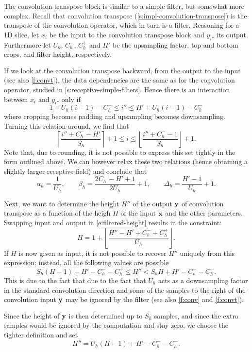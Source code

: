 The convolution transpose block is similar to a simple filter, but somewhat more complex. Recall that convolution transpose (\autoref{s:impl-convolution-transpose}) is the transpose of the convolution operator, which in turn is a filter. Reasoning for a 1D slice, let $x_i$ be the input to the convolution transpose block and $y_{i''}$ its output. Furthermore let $U_h$, $C_h^-$, $C_h^+$ and $H'$ be the upsampling factor, top and bottom crops, and filter height, respectively.

If we look at the convolution transpose backward, from the output to the input (see also \autoref{f:convt}), the data dependencies are the same as for the convolution operator, studied in \autoref{s:receptive-simple-filters}. Hence there is an interaction between $x_i$ and $y_{i''}$ only if
\begin{equation}\label{e:convt-bounds}
   1 + U_h(i - 1) - C_h^- \leq i'' \leq H' + U_h(i - 1) - C_h^-
\end{equation}
where cropping becomes padding and upsampling becomes downsampling. Turning this relation around, we find that
\[
 \left\lceil \frac{i'' + C_h^- -H'}{S_h} \right\rceil + 1
 \leq
 i
 \leq
 \left\lfloor \frac{i'' + C_h^- - 1}{S_h} \right\rfloor + 1 .
\]
Note that, due to rounding, it is not possible to express this set tightly in the form outlined above. We can however relax these two relations (hence obtaining a slightly larger receptive field) and conclude that
\[
\alpha_h = \frac{1}{U_h},
\qquad
\beta_h = \frac{2C_h^- - H' + 1}{2 U_h} + 1,
\qquad
\Delta_h = \frac{H' -1}{U_h} + 1.
\]

Next, we want to determine the height $H''$ of the output $\mathbf{y}$ of convolution transpose as a function of the heigh $H$ of the input $\mathbf{x}$ and the other parameters. Swapping input and output in  \autoref{e:filtered-height} results in the constraint:
\[
H = 1+ \left\lfloor \frac{H'' - H' + C_h^- + C_h^+}{U_h} \right\rfloor.
\]
If $H$ is now given as input, it is not possible to recover $H''$ uniquely from this expression; instead, all the following values are possible
\[
   S_h (H-1) +H' -  C_h^- - C_h^+ \leq H'' < S_h H +H' -  C_h^- - C_h^+.
\]
This is due to the fact that due to the fact that $U_h$ acts as a downsampling factor in the standard convolution direction and some of the samples to the right of the convolution input $\mathbf{y}$ may be ignored by the filter (see also \autoref{f:conv} and \autoref{f:convt}).

Since the height of $\mathbf{y}$ is then determined up to $S_h$ samples, and since the extra samples would be ignored by the computation and stay zero, we choose the tighter definition and set
\[
H'' =  U_h (H-1) +H' -  C_h^- - C_h^+.
\]

